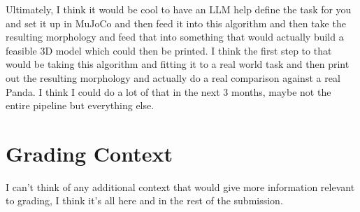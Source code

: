 \documentclass[11pt]{article}
\begin{document}
Ultimately, I think it would be cool to have an LLM help define the task for you and set it up in MuJoCo and then feed it into this algorithm and then take the resulting morphology and feed that into something that would actually build a feasible 3D model which could then be printed.
I think the first step to that would be taking this algorithm and fitting it to a real world task and then print out the resulting morphology and actually do a real comparison against a real Panda.
I think I could do a lot of that in the next 3 months, maybe not the entire pipeline but everything else.

\section{Grading Context}
I can't think of any additional context that would give more information relevant to grading, I think it's all here and in the rest of the submission.
\end{document}
